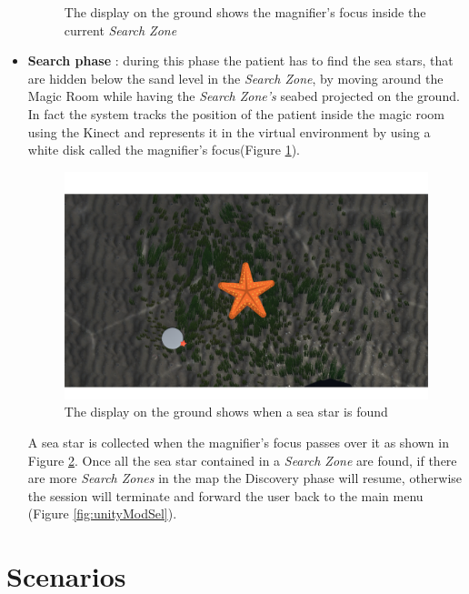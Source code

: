 \begin{itemize}
\begin{figure}[h!]
		\caption{The display on the ground shows the magnifier's focus inside the current \textit{Search Zone}}
		\label{fig:unityMagnifierFocus}
	\end{figure}
	\item \textbf{Search phase} : during this phase the patient has to find the sea stars, that are hidden below the sand level in the \textit{Search Zone}, by moving around the Magic Room while having the \textit{Search Zone's} seabed projected on the ground. In fact the system tracks the position of the patient inside the magic room using the Kinect and represents it in the virtual environment by using a white disk called the magnifier's focus(Figure \ref{fig:unityMagnifierFocus}).
		\begin{figure}[h!]
			\includegraphics[width=\textwidth]{images/UX/unity/search/4-seastarFound}
			\caption{The display on the ground shows when a sea star is found}
			\label{fig:unityMagnifierSeastar}
		\end{figure}
	A sea star is collected when the magnifier's focus passes over it as shown in Figure \ref{fig:unityMagnifierSeastar}. Once all the sea star contained in a \textit{Search Zone} are found, if there are more \textit{Search Zones} in the map the Discovery phase will resume, otherwise the session will terminate and forward the user back to the main menu (Figure \ref{fig:unityModSel}).
\end{itemize}

\section{Scenarios}
